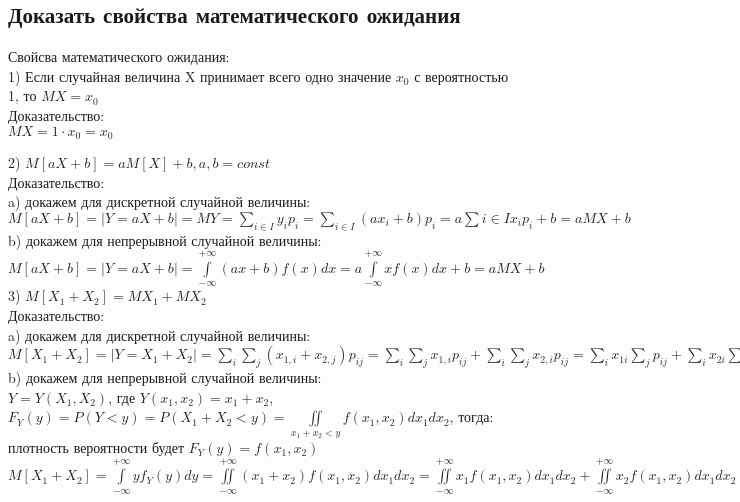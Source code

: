 \subsection{Доказать свойства математического ожидания}
Свойсва математического ожидания:\\
1) Если случайная величина X принимает всего одно значение $x_{0}$ с вероятностью 1, то $MX = x_{0}$\\
Доказательство:\\
$MX = 1 \cdot x_{0} = x_{0}$

2) $M[aX + b] = aM[X] + b, a,b = const$\\
Доказательство:\\
a) докажем для дискретной случайной величины:\\
$M[aX + b] = |Y = aX + b| = MY = \sum\limits_{i \in I} y_{i} p_{i} = \sum\limits_{i \in I} (a x_{i} + b) p_{i} = a \sum\limits{i \in I} x_{i} p_{i} + b = a MX + b$
b) докажем для непрерывной случайной величины:\\
$M[aX + b] = |Y= aX + b| = \int\limits_{-\infty}^{+\infty}(a x + b) f(x) dx = a \int\limits_{-\infty}^{+\infty} x f(x) dx + b = a MX + b$\\

3) $M[X_{1} + X_{2}] = MX_{1} + MX_{2}$\\
Доказательство:\\
a) докажем для дискретной случайной величины:\\
$M[X_{1} + X_{2}] = |Y = X_{1} + X_{2}| = \sum\limits_{i}\sum\limits_{j} (x_{1,i} + x_{2, j})p_{ij} = \sum\limits_{i} \sum\limits_{j} x_{1,i} p_{ij} + \sum\limits_{i} \sum\limits_{j} x_{2,i} p_{ij} = \sum\limits_{i} x_{1i} \sum\limits_{j} p_{ij} + \sum\limits_{i} x_{2i} \sum\limits_{j} p_{ij} = \sum\limits_{i} x_{1i} P(X_{1} = x_{1i}) + \sum\limits_{j} x_{2j} P(X_{2} = X_{2j}) = MX_{1} + MX_{2}$\\
b) докажем для непрерывной случайной величины:\\
$Y = Y(X_{1}, X_{2})$, где $Y(x_{1}, x_{2}) = x_{1} + x_{2}$,\\
$F_{Y}(y) = P(Y < y) = P(X_{1} + X_{2} < y) = \iint\limits_{x_{1} + x_{2} < y} f(x_{1}, x_{2}) dx_{1} dx_{2}$, тогда:
плотность вероятности будет $F_{Y}(y) =f(x_{1}, x_{2})$\\
$M[X_{1} + X_{2}] = \int\limits_{-\infty}^{+\infty} y f_{Y}(y) dy =\iint\limits_{-\infty}^{+\infty} (x_{1} + x_{2}) f(x_{1}, x_{2}) dx_{1} dx_{2} =  \iint\limits_{-\infty}^{+\infty} x_{1} f(x_{1}, x_{2}) dx_{1} dx_{2} + \iint\limits_{-\infty}^{+\infty} x_{2} f(x_{1}, x_{2}) dx_{1} dx_{2} = \int\limits_{-\infty}^{+\infty} x_{1} dx_{1}  \int\limits_{-\infty}^{+\infty} f(x_{1}, x_{2}) dx_{2} + \int\limits_{-\infty}^{+\infty} x_{2} dx_{2}  \int\limits_{-\infty}^{+\infty} f(x_{1}, x_{2}) dx_{1} =  \int\limits_{-\infty}^{+\infty} x_{1} f_{X_{1}}(x_{1}) dx_{1} + \int\limits_{-\infty}^{+\infty} x_{2} f_{X_{2}}(x_{2}) dx_{2} = MX_{1} + MX_{2}$\\

